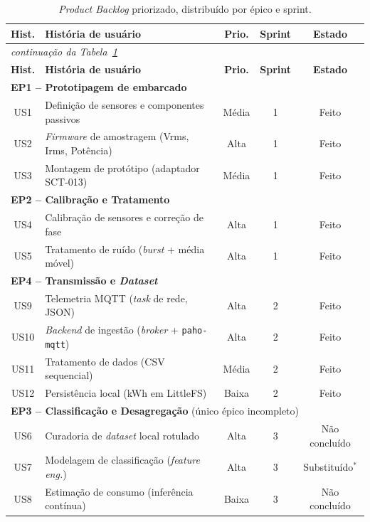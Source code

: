 \documentclass[12pt,a4paper]{article}
\begin{document}
\begin{longtable}{c p{5.6cm} c c c}
\caption{\textit{Product Backlog} priorizado, distribu\'ido por \'epico e sprint.}
\label{tab:backlog}\\
\toprule
\textbf{Hist.} & \textbf{Hist\'oria de usu\'ario} & \textbf{Prio.} & \textbf{Sprint} & \textbf{Estado} \\
\midrule
\endfirsthead
\multicolumn{5}{l}{\footnotesize\itshape continua\c{c}\~ao da Tabela~\ref{tab:backlog}}\\
\toprule
\textbf{Hist.} & \textbf{Hist\'oria de usu\'ario} & \textbf{Prio.} & \textbf{Sprint} & \textbf{Estado} \\
\midrule
\endhead
\multicolumn{5}{l}{\cellcolor{green!8}\textbf{EP1 -- Prototipagem de embarcado}} \\
US1 & Defini\c{c}\~ao de sensores e componentes passivos & M\'edia & 1 & Feito \\
US2 & \textit{Firmware} de amostragem (Vrms, Irms, Pot\^encia) & Alta & 1 & Feito \\
US3 & Montagem de prot\'otipo (adaptador SCT-013) & M\'edia & 1 & Feito \\
\midrule
\multicolumn{5}{l}{\cellcolor{green!8}\textbf{EP2 -- Calibra\c{c}\~ao e Tratamento}} \\
US4 & Calibra\c{c}\~ao de sensores e corre\c{c}\~ao de fase & Alta & 1 & Feito \\
US5 & Tratamento de ru\'ido (\textit{burst} + m\'edia m\'ovel) & Alta & 1 & Feito \\
\midrule
\multicolumn{5}{l}{\cellcolor{green!8}\textbf{EP4 -- Transmiss\~ao e \textit{Dataset}}} \\
US9  & Telemetria MQTT (\textit{task} de rede, JSON) & Alta & 2 & Feito \\
US10 & \textit{Backend} de ingest\~ao (\textit{broker} + \texttt{paho-mqtt}) & Alta & 2 & Feito \\
US11 & Tratamento de dados (CSV sequencial) & M\'edia & 2 & Feito \\
US12 & Persist\^encia local (kWh em LittleFS) & Baixa & 2 & Feito \\
\midrule
\multicolumn{5}{l}{\cellcolor{green!8}\textbf{EP3 -- Classifica\c{c}\~ao e Desagrega\c{c}\~ao} \footnotesize(\'unico \'epico incompleto)} \\
US6 & Curadoria de \textit{dataset} local rotulado & Alta & 3 & N\~ao conclu\'ido \\
US7 & Modelagem de classifica\c{c}\~ao (\textit{feature eng.}) & Alta & 3 & Substitu\'ido$^{*}$ \\
US8 & Estima\c{c}\~ao de consumo (infer\^encia cont\'inua) & Baixa & 3 & N\~ao conclu\'ido \\
\bottomrule
\end{longtable}
\end{document}
